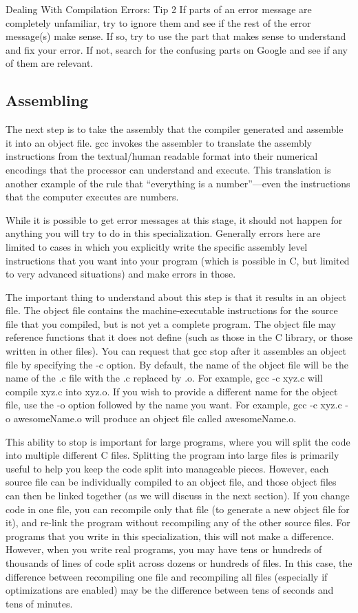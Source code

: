 \documentclass[11pt, a4paper]{article}
\begin{document}
Dealing With Compilation Errors: Tip 2 If parts of an error message are completely unfamiliar, try to ignore them and see if the rest of the error message(s) make sense. If so, try to use the part that makes sense to understand and fix your error. If not, search for the confusing parts on Google and see if any of them are relevant.


\subsection{Assembling}%
\label{sub:assembling}


The next step is to take the assembly that the compiler generated and assemble it into an object file. gcc invokes the assembler to translate the assembly instructions from the textual/human readable format into their numerical encodings that the processor can understand and execute. This translation is another example of the rule that “everything is a number”—even the instructions that the computer executes are numbers.

While it is possible to get error messages at this stage, it should not happen for anything you will try to do in this specialization. Generally errors here are limited to cases in which you explicitly write the specific assembly level instructions that you want into your program (which is possible in C, but limited to very advanced situations) and make errors in those.

The important thing to understand about this step is that it results in an object file. The object file contains the machine-executable instructions for the source file that you compiled, but is not yet a complete program. The object file may reference functions that it does not define (such as those in the C library, or those written in other files). You can request that gcc stop after it assembles an object file by specifying the -c option. By default, the name of the object file will be the name of the .c file with the .c replaced by .o. For example, gcc -c xyz.c will compile xyz.c into xyz.o. If you wish to provide a different name for the object file, use the -o option followed by the name you want. For example, gcc -c xyz.c -o awesomeName.o will produce an object file called awesomeName.o.

This ability to stop is important for large programs, where you will split the code into multiple different C files. Splitting the program into large files is primarily useful to help you keep the code split into manageable pieces. However, each source file can be individually compiled to an object file, and those object files can then be linked together (as we will discuss in the next section). If you change code in one file, you can recompile only that file (to generate a new object file for it), and re-link the program without recompiling any of the other source files. For programs that you write in this specialization, this will not make a difference. However, when you write real programs, you may have tens or hundreds of thousands of lines of code split across dozens or hundreds of files. In this case, the difference between recompiling one file and recompiling all files (especially if optimizations are enabled) may be the difference between tens of seconds and tens of minutes.
\end{document}

